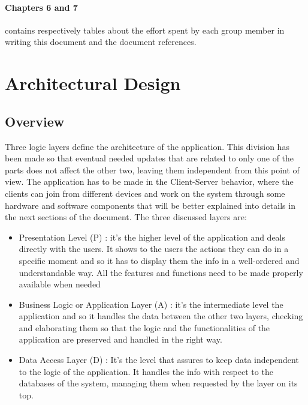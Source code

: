 \documentclass[]{article}
\begin{document}
			\paragraph{Chapters 6 and 7} contains respectively tables about the effort spent by each group member in writing this document and the document references.
			\newpage
			
		
		\section{Architectural Design}
			
			\subsection{Overview}
				\begin{paragraph}
					\newline
					Three logic layers define the architecture of the application. This division has been made so that eventual needed updates that are related to only one of the parts does not affect the other two, leaving them independent from this point of view. The application has to be made in the Client-Server behavior, where the clients can join from different devices and work on the system through some hardware and software components that will be better explained into details in the next sections of the document. The three discussed layers are:\\
					\begin{itemize}
						\item Presentation Level (P) : it’s the higher level of the application and deals directly with the users. It shows to the users the actions they can do in a specific moment and so it has to display them the info in a well-ordered and understandable way. All the features and functions need to be made properly available when needed\\
						\item Business Logic or Application Layer (A) :  it’s the intermediate level the application and so it handles the data between the other two layers, checking and elaborating them so that the logic and the functionalities of the application are preserved and handled in the right way.\\
						\item Data Access Layer (D) : It’s the level that assures to keep data independent to the logic of the application. It handles the info with respect to the databases of the system, managing them when requested by the layer on its top.\\ \newline
					\end{itemize}
					

\end{paragraph}
\end{document}
